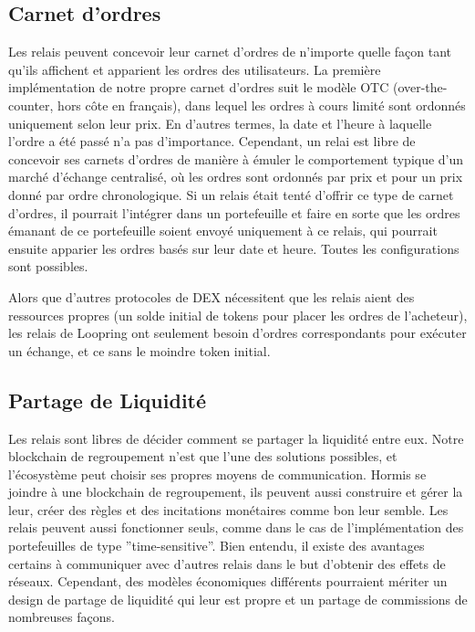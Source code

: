 \documentclass[UTF8,nofonts]{article}
\begin{document}
\begin{multicols}{2}
\subsection{Carnet d'ordres\label{sec:order_book}}
Les relais peuvent concevoir leur carnet d'ordres de n'importe quelle façon tant qu'ils affichent et apparient les ordres des utilisateurs. La première implémentation de notre propre carnet d'ordres suit le modèle OTC (over-the-counter, hors côte en français), dans lequel les ordres à cours limité sont ordonnés uniquement selon leur prix. En d'autres termes, la date et l'heure à laquelle l'ordre a été passé n'a pas d'importance. Cependant, un relai est libre de concevoir ses carnets d'ordres de manière à émuler le comportement typique d'un marché d'échange centralisé, où les ordres sont ordonnés par prix et pour un prix donné par ordre chronologique. Si un relais était tenté d'offrir ce type de carnet d'ordres, il pourrait l'intégrer dans un portefeuille et faire en sorte que les ordres émanant de ce portefeuille soient envoyé uniquement à ce relais, qui pourrait ensuite apparier les ordres basés sur leur date et heure. Toutes les configurations sont possibles.

Alors que d'autres protocoles de DEX nécessitent que les relais aient des ressources propres (un solde initial de tokens pour placer les ordres de l'acheteur), les relais de Loopring ont seulement besoin d'ordres correspondants pour exécuter un échange, et ce sans le moindre token initial.

\subsection{Partage de Liquidité\label{sec:liquidity_sharing}}
Les relais sont libres de décider comment se partager la liquidité entre eux. Notre blockchain de regroupement n'est que l'une des solutions possibles, et l'écosystème peut choisir ses propres moyens de communication. Hormis se joindre à une blockchain de regroupement, ils peuvent aussi construire et gérer la leur, créer des règles et des incitations monétaires comme bon leur semble. Les relais peuvent aussi fonctionner seuls, comme dans le cas de l'implémentation des portefeuilles de type ''time-sensitive''. Bien entendu, il existe des avantages certains à communiquer avec d'autres relais dans le but d'obtenir des effets de réseaux. Cependant, des modèles économiques différents pourraient mériter un design de partage de liquidité qui leur est propre et un partage de commissions de nombreuses façons.


\end{multicols}
\end{document}
